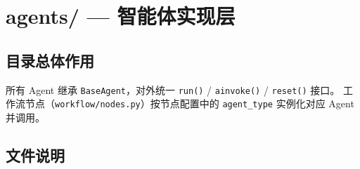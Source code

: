 \section{agents/ — 智能体实现层}

\subsection{目录总体作用}

所有 Agent 继承 \texttt{BaseAgent}，对外统一 \texttt{run()} / \texttt{ainvoke()} / \texttt{reset()} 接口。
工作流节点（\texttt{workflow/nodes.py}）按节点配置中的 \texttt{agent\_type} 实例化对应 Agent 并调用。

\subsection{文件说明}

